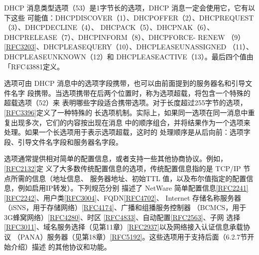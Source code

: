 DHCP 消息类型选项（53）是1字节长的选项，DHCP 消息一定会使用它，它有以下这些
可能值：DHCPDISCOVER（1）、DHCPOFFER（2）、DHCPREQUEST（3）、DHCPDECLINE（4）、
DHCPACK（5）、DHCPNAK（6）、DHCPRELEASE（7）、DHCPINFORM（8）、DHCPFORCE-
RENEW
（9）\href{https://www.rfc-editor.org/rfc/rfc3203}{\href{https://www.rfc-editor.org/rfc/rfc3203}{[RFC3203]}}、DHCPLEASEQUERY（10）、DHCPLEASEUNASSIGNED
（11）、
DHCPLEASEUNKNOWN（12）和 DHCPLEASEACTIVE（13）。最后四个值由「RFC43881定义。

选项可由 DHCP 消息中的选项字段携带，也可以由前面提到的服务器名和引导文件名字
段携带。当选项携带在后两个位置时，称为选项超载，将包含一个特殊的超载选项（52）来
表明哪些字段适合携带选项。对于长度超过255字节的选项，\href{https://www.rfc-editor.org/rfc/rfc3396}{\href{https://www.rfc-editor.org/rfc/rfc3396}{[RFC3396]}}定义了一种特殊的
长选项机制。实际上，如果同一选项在同一消息中重复出现多次，它们的内容按出现在消息
中的顺序组合，并将结果作为一个选项来处理。如果一个长选项用于表示选项超载，这时的
处理顺序是从后向前：选项字段、引导文件名字段和服务器名字段。

选项通常提供相对简单的配置信息，或者支持一些其他协商协议。例如，\href{https://www.rfc-editor.org/rfc/rfc2132}{\href{https://www.rfc-editor.org/rfc/rfc2132}{[RFC2132]}}定
义了大多数传统配置信息的选项，传统配置信息指的是 TCP/IP 节点所需的信息（地址信息、
服务器地址、初始TTL 值，以及布尔值指定的配置信息，例如启用IP转发）。下列规范分别
描述了 NetWare
简单配置信息\href{https://www.rfc-editor.org/rfc/rfc2241}{\href{https://www.rfc-editor.org/rfc/rfc2241}{[RFC2241]}}\href{https://www.rfc-editor.org/rfc/rfc2242}{\href{https://www.rfc-editor.org/rfc/rfc2242}{[RFC2242]}}、用户类\href{https://www.rfc-editor.org/rfc/rfc3004}{\href{https://www.rfc-editor.org/rfc/rfc3004}{[RFC3004]}}、FQDN\href{https://www.rfc-editor.org/rfc/rfc4702}{\href{https://www.rfc-editor.org/rfc/rfc4702}{[RFC4702]}}、
Internet
存储名称服务器（iSNS，用于存储网络）\href{https://www.rfc-editor.org/rfc/rfc4174}{\href{https://www.rfc-editor.org/rfc/rfc4174}{[RFC4174]}}、广播和组播服务控制器
（BCMCS，用于3G蜂窝网络）\href{https://www.rfc-editor.org/rfc/rfc4280}{\href{https://www.rfc-editor.org/rfc/rfc4280}{[RFC4280]}}、时区
\href{https://www.rfc-editor.org/rfc/rfc4833}{\href{https://www.rfc-editor.org/rfc/rfc4833}{[RFC4833]}}、自动配置\href{https://www.rfc-editor.org/rfc/rfc2563}{\href{https://www.rfc-editor.org/rfc/rfc2563}{[RFC2563]}}、子网
选择\href{https://www.rfc-editor.org/rfc/rfc3011}{\href{https://www.rfc-editor.org/rfc/rfc3011}{[RFC3011]}}、域名服务选择（见第11章）\href{https://www.rfc-editor.org/rfc/rfc2937}{\href{https://www.rfc-editor.org/rfc/rfc2937}{[RFC2937]}}以及网络接入认证信息承载协议
（PANA）服务器（见第18章）\href{https://www.rfc-editor.org/rfc/rfc5192}{\href{https://www.rfc-editor.org/rfc/rfc5192}{[RFC5192]}}。这些选项用于支持后面（6.2.7节开始介绍）描述
的其他协议和功能。

